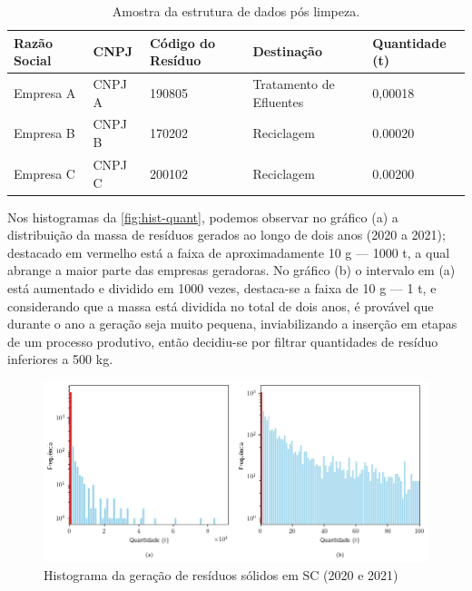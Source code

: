 \setcounter{table}{0}

\begin{table}[htb]
    \ABNTEXfontereduzida
    \centering
    \caption{Amostra da estrutura de dados pós limpeza. \label{tab:Tab_demo1}}
    \begin{tabular}{@{}lllll@{}}
        \toprule
        \textbf{Razão Social} & \textbf{CNPJ} & \textbf{Código do Resíduo} & \textbf{Destinação} & \textbf{Quantidade (\gls{t})} \\ \midrule
        Empresa A & CNPJ A & 190805 & Tratamento de Efluentes & 0,00018 \\
        Empresa B & CNPJ B & 170202 & Reciclagem              & 0.00020 \\
        Empresa C & CNPJ C & 200102 & Reciclagem              & 0.00200 \\ \bottomrule
        \end{tabular}
\end{table}

Nos histogramas da \autoref{fig:hist-quant}, podemos observar no gráfico (a) a distribuição da massa de resíduos gerados ao longo de dois anos (2020 a 2021); destacado em vermelho está a faixa de aproximadamente 10 \gls{g} — 1000 \gls{t}, a qual abrange a maior parte das empresas geradoras.
No gráfico (b) o intervalo em (a) está aumentado e dividido em 1000 vezes, destaca-se a faixa de 10 \gls{g} — 1 \gls{t}, e considerando que a massa está dividida no total de dois anos, é provável que durante o ano a geração seja muito pequena, inviabilizando a inserção em etapas de um processo produtivo, então decidiu-se por filtrar quantidades de resíduo inferiores a 500 \gls{kg}.

\begin{figure}[htb]
	\caption{\label{fig:hist-quant} Histograma da geração de resíduos sólidos em \gls{SC} (2020 e 2021)}
	\begin{center}
		\includegraphics[scale=0.75]{images/hist-quantidade.png}
	\end{center}
\end{figure}

